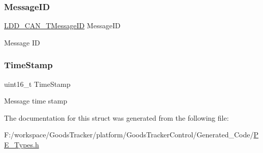 \subsubsection{\texorpdfstring{Message\+ID}{MessageID}}
{\footnotesize\ttfamily \hyperlink{group___p_e___types__module_gaecf72f09b92ddd90b24939b4e8a901e0}{L\+D\+D\+\_\+\+C\+A\+N\+\_\+\+T\+Message\+ID} Message\+ID}

Message ID \mbox{\label{struct_l_d_d___c_a_n___t_frame_a2e0519fbe4a2c218f4ff9ec1b3f5320f}} 
\subsubsection{\texorpdfstring{Time\+Stamp}{TimeStamp}}
{\footnotesize\ttfamily uint16\+\_\+t Time\+Stamp}

Message time stamp 

The documentation for this struct was generated from the following file\+:\begin{DoxyCompactItemize}
\item 
F\+:/workspace/\+Goods\+Tracker/platform/\+Goods\+Tracker\+Control/\+Generated\+\_\+\+Code/\hyperlink{_p_e___types_8h}{P\+E\+\_\+\+Types.\+h}\end{DoxyCompactItemize}
